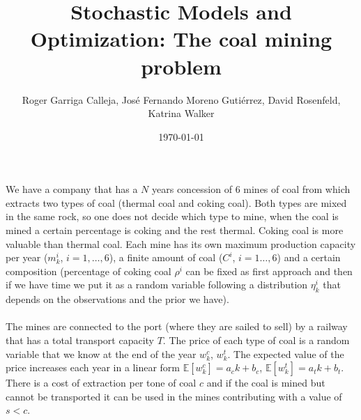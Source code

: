\documentclass[11pt, english]{article}
\title{Stochastic Models and Optimization: The coal mining problem}
\author{Roger Garriga Calleja, José Fernando Moreno Gutiérrez, David Rosenfeld, Katrina Walker}
\date{\today}
\begin{document}
	\maketitle


We have a company that has a $N$ years concession of 6 mines of coal from which extracts two types of coal (thermal coal and coking coal). Both types are mixed in the same rock, so one does not decide which type to mine, when the coal is mined a certain percentage is coking and the rest thermal. Coking coal is more valuable than thermal coal. Each mine has its own maximum production capacity per year ($m_k^i$, $i=1,\dots,6$), a finite amount of coal ($C^i$, $i=1\dots,6$) and a certain composition (percentage of coking coal $\rho^i$ can be fixed as first approach and then if we have time we put it as a random variable following a distribution $\eta_k^i$ that depends on the observations and the prior we have). \\\\
The mines are connected to the port (where they are sailed to sell) by a railway that has a total transport capacity $T$. The price of each type of coal is a random variable that we know at the end of the year $w_k^c$, $w_k^t$. The expected value of the price increases each year in a linear form $\mathbb{E}[w_k^c]=a_ck+b_c$, $\mathbb{E}[w_k^t]=a_tk+b_t$. There is a cost of extraction per tone of coal $c$ and if the coal is mined but cannot be transported it can be used in the mines contributing with a value of $s<c$.\\\\
\end{document}
